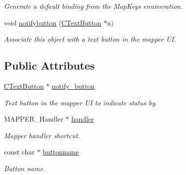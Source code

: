 \begin{DoxyCompactItemize}
\begin{DoxyCompactList}\small\item\em Generate a default binding from the Map\-Keys enumeration. \end{DoxyCompactList}\item 
\hypertarget{classCHandlerEvent_a3bd14f3961c29799530602c8e2d5a6fe}{void \hyperlink{classCHandlerEvent_a3bd14f3961c29799530602c8e2d5a6fe}{notifybutton} (\hyperlink{classCTextButton}{C\-Text\-Button} $\ast$n)}\label{classCHandlerEvent_a3bd14f3961c29799530602c8e2d5a6fe}

\begin{DoxyCompactList}\small\item\em Associate this object with a text button in the mapper U\-I. \end{DoxyCompactList}\end{DoxyCompactItemize}
\subsection*{Public Attributes}
\begin{DoxyCompactItemize}
\item 
\hypertarget{classCHandlerEvent_ac636235e80032332d688fe888ebd5cf4}{\hyperlink{classCTextButton}{C\-Text\-Button} $\ast$ \hyperlink{classCHandlerEvent_ac636235e80032332d688fe888ebd5cf4}{notify\-\_\-button}}\label{classCHandlerEvent_ac636235e80032332d688fe888ebd5cf4}

\begin{DoxyCompactList}\small\item\em Text button in the mapper U\-I to indicate status by. \end{DoxyCompactList}\item 
\hypertarget{classCHandlerEvent_a9227a65125fadc33d775cc0de3b29393}{M\-A\-P\-P\-E\-R\-\_\-\-Handler $\ast$ \hyperlink{classCHandlerEvent_a9227a65125fadc33d775cc0de3b29393}{handler}}\label{classCHandlerEvent_a9227a65125fadc33d775cc0de3b29393}

\begin{DoxyCompactList}\small\item\em Mapper handler shortcut. \end{DoxyCompactList}\item 
\hypertarget{classCHandlerEvent_a935a8c622ac72d46512f5c88fefacda8}{const char $\ast$ \hyperlink{classCHandlerEvent_a935a8c622ac72d46512f5c88fefacda8}{buttonname}}\label{classCHandlerEvent_a935a8c622ac72d46512f5c88fefacda8}

\begin{DoxyCompactList}\small\item\em Button name. \end{DoxyCompactList}\end{DoxyCompactItemize}
